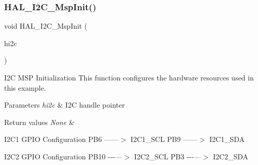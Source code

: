 \subsubsection{\texorpdfstring{H\+A\+L\+\_\+\+I2\+C\+\_\+\+Msp\+Init()}{HAL\_I2C\_MspInit()}}
{\footnotesize\ttfamily void H\+A\+L\+\_\+\+I2\+C\+\_\+\+Msp\+Init (\begin{DoxyParamCaption}\item[{\hyperlink{struct_____i2_c___handle_type_def}{I2\+C\+\_\+\+Handle\+Type\+Def} $\ast$}]{hi2c }\end{DoxyParamCaption})}



I2C M\+SP Initialization This function configures the hardware resources used in this example. 


\begin{DoxyParams}{Parameters}
{\em hi2c} & I2C handle pointer \\
\hline
\end{DoxyParams}

\begin{DoxyRetVals}{Return values}
{\em None} & \\
\hline
\end{DoxyRetVals}
I2\+C1 G\+P\+IO Configuration P\+B6 ------$>$ I2\+C1\+\_\+\+S\+CL P\+B9 ------$>$ I2\+C1\+\_\+\+S\+DA

I2\+C2 G\+P\+IO Configuration P\+B10 -\/-\/-\/---$>$ I2\+C2\+\_\+\+S\+CL P\+B3 -\/-\/-\/---$>$ I2\+C2\+\_\+\+S\+DA